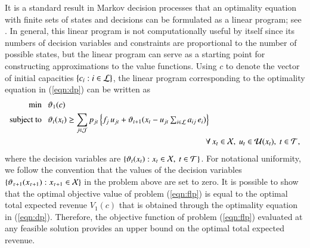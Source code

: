 It is a standard result in Markov decision processes that an optimality equation with finite sets of states and decisions can be formulated as a linear program; see . In general, this linear program is not computationally useful by itself since its  numbers of decision variables and constraints are proportional to the number of possible states, but the linear program can serve as a starting point for constructing approximations to the value functions. Using $c$ to denote the vector of initial capacities $\{ c_i : i \in {\cal L} \}$, the linear program corresponding to the optimality equation in (\ref{eqn:dp}) can be written as 
%
%
\begin{subequations}
\label{eqn:flp}
\begin{align}
\min ~~~ & \vartheta_1(c)
\label{eqn:flp_obj}
\\
\mbox{subject to}~~~ & \vartheta_t(x_t) \geq \sum_{j \in {\cal J}} p_{jt} {\,} \Big\{ f_j  {\,} u_{jt} + \vartheta_{t+1}(x_t - \textstyle u_{jt} \sum_{i \in {\cal L}} a_{ij} {\,} e_i ) \Big\} 
\nonumber
\\
&
\quad \qquad \qquad \qquad \qquad \qquad \qquad \qquad \qquad \qquad
\forall {\,} x_t \in {\cal X},~ u_t \in {\cal U}(x_t),~ t \in {\cal T},
\label{eqn:flp_e}
\end{align}
\end{subequations}
%
%
where the decision variables are $\{ \vartheta_t(x_t) : x_t \in {\cal X},~ t \in {\cal T}\}$. For notational uniformity, we follow the convention that the values of the decision variables $\{ \vartheta_{\tau+1}(x_{\tau+1}) : x_{\tau+1} \in {\cal X}\}$ in the problem above are set to zero. It is possible to show that the optimal objective value of problem (\ref{eqn:flp}) is equal to the optimal total expected revenue $V_1(c)$ that is obtained through the optimality equation in (\ref{eqn:dp}). Therefore, the objective function of problem (\ref{eqn:flp}) evaluated at any feasible solution provides an upper bound on the optimal total expected revenue. 


